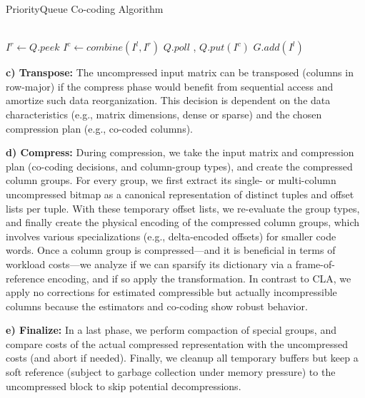 \begin{algorithm}[!t]
  \caption{PriorityQueue Co-coding Algorithm}\label{alg:priorityQueue}
  \begin{algorithmic}
    \\
     
    \State $I^r \gets Q.peek$                
    \State $I^c \gets combine(I^l, I^r)$       
     
    \State $Q.poll$ , $Q.put(I^c)$ 
    \Else
    \State $G.add(I^l)$ 
    \EndIf
    \EndWhile
  \end{algorithmic}
\end{algorithm}

\textbf{c) Transpose:} The uncompressed input matrix can be transposed (columns in row-major) if the compress phase would benefit from sequential access and amortize such data reorganization. This decision is dependent on the data characteristics (e.g., matrix dimensions, dense or sparse) and the chosen compression plan (e.g., co-coded columns).


\textbf{d) Compress:} During compression, we take the input matrix and compression plan (co-coding decisions, and column-group types), and create the compressed column groups. For every group, we first extract its single- or multi-column uncompressed bitmap as a canonical representation of distinct tuples and offset lists per tuple. With these temporary offset lists, we re-evaluate the group types, and finally create the physical encoding of the compressed column groups, which involves various specializations (e.g., delta-encoded offsets) for smaller code words. Once a column group is compressed---and it is beneficial in terms of workload costs---we analyze if we can sparsify its dictionary via a frame-of-reference encoding, and if so apply the transformation. In contrast to CLA, we apply no corrections for estimated compressible but actually incompressible columns because the estimators and co-coding show robust behavior.

\textbf{e) Finalize:} In a last phase, we perform compaction of special groups, and compare costs of the actual compressed representation with the uncompressed costs (and abort if needed). Finally, we cleanup all temporary buffers but keep a soft reference (subject to garbage collection under memory pressure) to the uncompressed block to skip potential decompressions.

